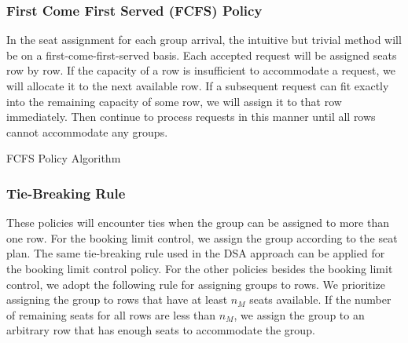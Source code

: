 \subsubsection*{First Come First Served (FCFS) Policy}
In the seat assignment for each group arrival, the intuitive but trivial method will be on a first-come-first-served basis. Each accepted request will be assigned seats row by row. If the capacity of a row is insufficient to accommodate a request, we will allocate it to the next available row. If a subsequent request can fit exactly into the remaining capacity of some row, we will assign it to that row immediately. Then continue to process requests in this manner until all rows cannot accommodate any groups.

\begin{algorithm}[H]
  \caption{FCFS Policy Algorithm}\label{algo_fcfs}
\end{algorithm}

\subsubsection*{Tie-Breaking Rule}
These policies will encounter ties when the group can be assigned to more than one row.
For the booking limit control, we assign the group according to the seat plan. The same tie-breaking rule used in the DSA approach can be applied for the booking limit control policy.
For the other policies besides the booking limit control, we adopt the following rule for assigning groups to rows. We prioritize assigning the group to rows that have at least $n_M$ seats available. If the number of remaining seats for all rows are less than $n_M$, we assign the group to an arbitrary row that has enough seats to accommodate the group.

\newpage
